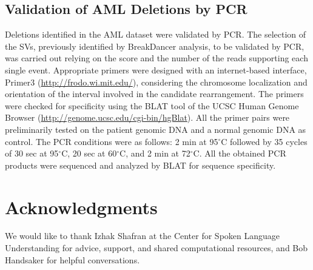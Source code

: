 \documentclass[11pt]{article}
\newcommand{\degree}{\ensuremath{^\circ}}
\begin{document}
\subsection{Validation of AML Deletions by PCR}

Deletions identified in the AML dataset were validated by PCR. The selection of the SVs, previously identified by BreakDancer analysis, to be validated by PCR, was carried out relying on the score and the number of the reads supporting each single event. Appropriate primers were designed with an internet-based interface, Primer3 (\url{http://frodo.wi.mit.edu/}), considering the chromosome localization and orientation of the interval involved in the candidate rearrangement. The primers were checked for specificity using the BLAT tool of the UCSC Human Genome Browser (\url{http://genome.ucsc.edu/cgi-bin/hgBlat}). All the primer pairs were preliminarily tested on the patient genomic DNA and a normal genomic DNA as control. The PCR conditions were as follows: 2 min at 95\degree C followed by 35 cycles of 30 sec at 95\degree C, 20 sec at 60\degree C, and 2 min at 72\degree C. All the obtained PCR products were sequenced and analyzed by BLAT for sequence specificity. 


\newpage

\section*{Acknowledgments}

We would like to thank Izhak Shafran at the Center for Spoken Language Understanding for advice, support, and shared computational resources, and Bob Handsaker for helpful conversations.

\printbibliography
\end{document}
